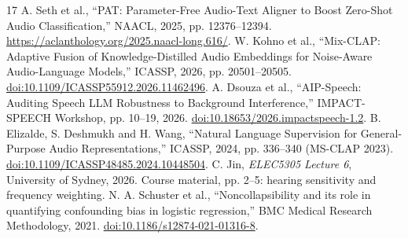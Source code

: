 \documentclass[a4paper,10pt]{article}
\begin{document}
\begin{thebibliography}{17}
 A. Seth et al., ``PAT: Parameter-Free Audio-Text Aligner to Boost Zero-Shot Audio Classification,'' NAACL, 2025, pp. 12376--12394. \url{https://aclanthology.org/2025.naacl-long.616/}.
 W. Kohno et al., ``Mix-CLAP: Adaptive Fusion of Knowledge-Distilled Audio Embeddings for Noise-Aware Audio-Language Models,'' ICASSP, 2026, pp. 20501--20505. \href{https://doi.org/10.1109/ICASSP55912.2026.11462496}{doi:10.1109/ICASSP55912.2026.11462496}.
 A. Dsouza et al., ``AIP-Speech: Auditing Speech LLM Robustness to Background Interference,'' IMPACT-SPEECH Workshop, pp. 10--19, 2026. \href{https://doi.org/10.18653/2026.impactspeech-1.2}{doi:10.18653/2026.impactspeech-1.2}. B. Elizalde, S. Deshmukh and H. Wang, ``Natural Language Supervision for General-Purpose Audio Representations,'' ICASSP, 2024, pp. 336--340 (MS-CLAP 2023). \href{https://doi.org/10.1109/ICASSP48485.2024.10448504}{doi:10.1109/ICASSP48485.2024.10448504}.
 C. Jin, \emph{ELEC5305 Lecture 6}, University of Sydney, 2026. Course material, pp. 2--5: hearing sensitivity and frequency weighting.
 N. A. Schuster et al., ``Noncollapsibility and its role in quantifying confounding bias in logistic regression,'' BMC Medical Research Methodology, 2021. \href{https://doi.org/10.1186/s12874-021-01316-8}{doi:10.1186/s12874-021-01316-8}.
\end{thebibliography}
\end{document}
